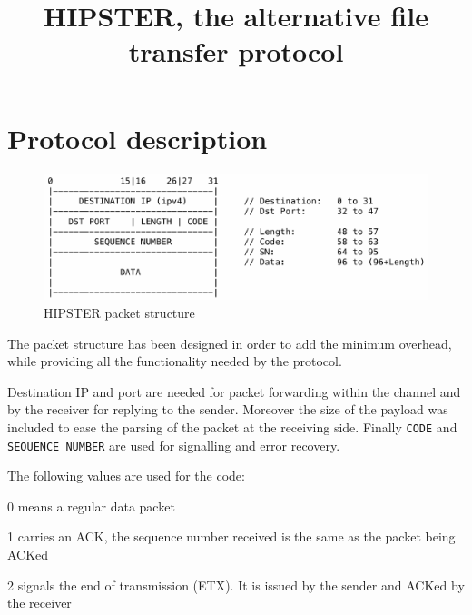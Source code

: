 \documentclass[10pt,onecolumn]{article}
\begin{document}
\title{HIPSTER, the alternative file transfer protocol}
\author{}
\date{}
\maketitle

\section{Protocol description}
\begin{figure}[htp]
	\centering
    \includegraphics[height=0.15\textheight]{tex/images/packet_structure.pdf}
	\caption{HIPSTER packet structure}
	\label{fig:header}
\end{figure}
The packet structure has been designed in order to add the minimum overhead,
while providing all the functionality needed by the protocol.

Destination IP and port are needed for packet forwarding within the channel
and by the receiver for replying to the sender. Moreover the size of the
payload was included to ease the parsing of the packet at the receiving side.
Finally \texttt{CODE} and \texttt{SEQUENCE NUMBER} are used for signalling
and error recovery.

The following values are used for the code:
\begin{compactitem}
\item 0 means a regular data packet
\item 1 carries an ACK, the sequence number received is the same as the packet
	being ACKed
\item 2 signals the end of transmission (ETX). It is issued by the sender and
	ACKed by the receiver
\end{compactitem}
\end{document}
